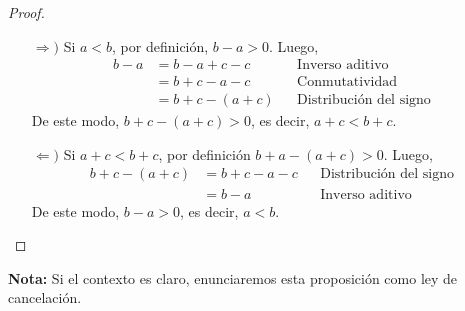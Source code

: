 \documentclass[11pt]{article}
\begin{document}
\begin{enumerate}[label=\alph*)]
    \vspace{-1em}\begin{proof} \leavevmode
    \begin{itemize}
        \item[$\Rightarrow)$] Si $a<b$, por definición, $b-a >0$. Luego, \begin{align*}
            b - a%
            &= b-a+c-c && \text{Inverso aditivo}\\
            &= b+c-a-c && \text{Conmutatividad}\\
            &= b+c-(a+c) && \text{Distribución del signo}
            \end{align*} De este modo, $b+c-(a+c)>0$, es decir, $a+c<b+c$.
        \item[$\Leftarrow)$] Si $a+c<b+c$, por definición $b+a-(a+c)>0$. Luego, \begin{align*}
            b+c-(a+c) &= b+c-a-c && \text{Distribución del signo}\\
            &= b-a && \text{Inverso aditivo}
        \end{align*} De este modo, $b-a>0$, es decir, $a<b$. \qedhere
        \end{itemize}    
    \end{proof} \vspace{-1em}
    \textbf{Nota:} Si el contexto es claro, enunciaremos esta proposición como ley de cancelación.

\pagebreak


\end{enumerate}
\end{document}
